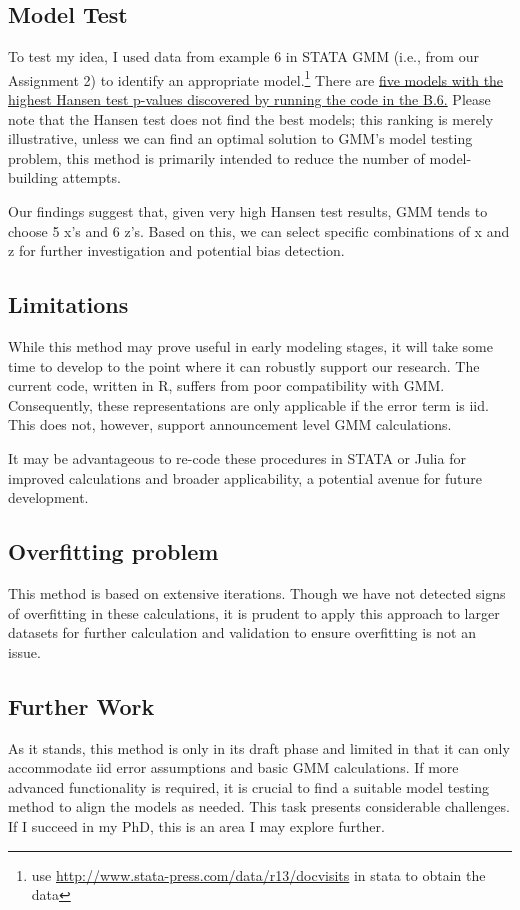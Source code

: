 \documentclass[12pt]{article}
\begin{document}
\subsection{Model Test}
To test my idea, I used data from example 6 in STATA GMM (i.e., from our Assignment 2) to identify an appropriate model.\footnote{use \url{http://www.stata-press.com/data/r13/docvisits} in stata to obtain the data} There are \hyperlink{Y}{ five models with the highest Hansen test p-values discovered by running the code in the B.6.} Please note that the Hansen test does not find the best models; this ranking is merely illustrative, unless we can find an optimal solution to GMM's model testing problem, this method is primarily intended to reduce the number of model-building attempts.

Our findings suggest that, given very high Hansen test results, GMM tends to choose 5 x's and 6 z's. Based on this, we can select specific combinations of x and z for further investigation and potential bias detection.

\subsection{Limitations}
While this method may prove useful in early modeling stages, it will take some time to develop to the point where it can robustly support our research. The current code, written in R, suffers from poor compatibility with GMM. Consequently, these representations are only applicable if the error term is iid. This does not, however, support announcement level GMM calculations.

It may be advantageous to re-code these procedures in STATA or Julia for improved calculations and broader applicability, a potential avenue for future development.

\subsection{Overfitting problem}
This method is based on extensive iterations. Though we have not detected signs of overfitting in these calculations, it is prudent to apply this approach to larger datasets for further calculation and validation to ensure overfitting is not an issue.

\subsection{Further Work}
As it stands, this method is only in its draft phase and limited in that it can only accommodate iid error assumptions and basic GMM calculations. If more advanced functionality is required, it is crucial to find a suitable model testing method to align the models as needed. This task presents considerable challenges. If I succeed in my PhD, this is an area I may explore further.
\end{document}
